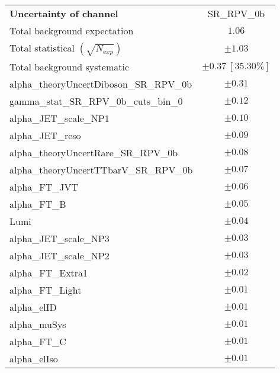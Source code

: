 
\begin{table}
\begin{center}
\setlength{\tabcolsep}{0.0pc}
\begin{tabular*}{\textwidth}{@{\extracolsep{\fill}}lc}
\noalign{\smallskip}\hline\noalign{\smallskip}
{\bfseries Uncertainty of channel}                                    & SR\_RPV\_0b            \\
\noalign{\smallskip}\hline\noalign{\smallskip}
Total background expectation             &  $1.06$       \\
\noalign{\smallskip}\hline\noalign{\smallskip}
Total statistical $(\sqrt{N_{\mathrm exp}})$              & $\pm 1.03$       \\
Total background systematic               & $\pm 0.37\ [35.30\%] $             \\
\noalign{\smallskip}\hline\noalign{\smallskip}
\noalign{\smallskip}\hline\noalign{\smallskip}
alpha\_theoryUncertDiboson\_SR\_RPV\_0b         & $\pm 0.31$       \\
gamma\_stat\_SR\_RPV\_0b\_cuts\_bin\_0         & $\pm 0.12$       \\
alpha\_JET\_scale\_NP1         & $\pm 0.10$       \\
alpha\_JET\_reso         & $\pm 0.09$       \\
alpha\_theoryUncertRare\_SR\_RPV\_0b         & $\pm 0.08$       \\
alpha\_theoryUncertTTbarV\_SR\_RPV\_0b         & $\pm 0.07$       \\
alpha\_FT\_JVT         & $\pm 0.06$       \\
alpha\_FT\_B         & $\pm 0.05$       \\
Lumi         & $\pm 0.04$       \\
alpha\_JET\_scale\_NP3         & $\pm 0.03$       \\
alpha\_JET\_scale\_NP2         & $\pm 0.03$       \\
alpha\_FT\_Extra1         & $\pm 0.02$       \\
alpha\_FT\_Light         & $\pm 0.01$       \\
alpha\_elID         & $\pm 0.01$       \\
alpha\_muSys         & $\pm 0.01$       \\
alpha\_FT\_C         & $\pm 0.01$       \\
alpha\_elIso         & $\pm 0.01$       \\

\end{tabular*}
\end{center}
\end{table}
